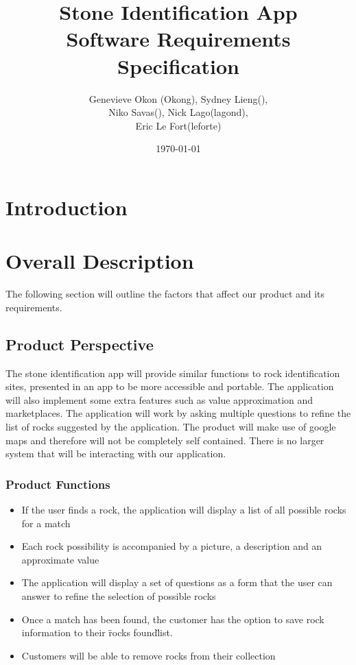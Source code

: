 \documentclass[titlepage]{article}
\title{Stone Identification App \\
	Software Requirements Specification}
\author{Genevieve Okon (Okong), Sydney Lieng(),\\
	Niko Savas(), Nick Lago(lagond),\\
	Eric Le Fort(leforte)}
\date{\today}
\begin{document}
\begin{titlepage}
\maketitle
\end{titlepage}
\tableofcontents
\newpage
\section{Introduction}
\label{sec:introduction}




\section{Overall Description}
The following section will outline the factors that affect our product and its requirements.\\

\subsection{Product Perspective}
The stone identification app will provide similar functions to rock identification sites, presented in an app to be more accessible and portable. The application will also implement some extra features such as value approximation and marketplaces. The application will work by asking multiple questions to refine the list of rocks suggested by the application. The product will make use of google maps and therefore will not be completely self contained. 
There is no larger system that will be interacting with our application.\\

\subsubsection{Product Functions}
\begin{itemize}

\item If the user finds a rock, the application will display a list of all possible rocks for a match \\
\item Each rock possibility is accompanied by a picture, a description and an approximate value\\
\item The application will display a set of questions as a form that the user can answer to refine the selection of possible rocks\\
\item Once a match has been found, the customer has the option to save rock information to their \"rocks found\" list.\\
\item Customers will be able to remove rocks from their collection\\



\end{itemize}
\end{document}
